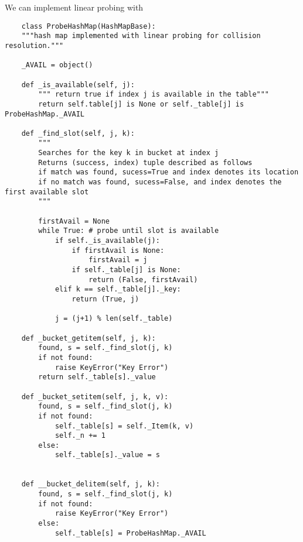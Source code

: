 \documentclass[]{article}
\begin{document}
We can implement linear probing with

\begin{lstlisting}
	class ProbeHashMap(HashMapBase):
	"""hash map implemented with linear probing for collision resolution."""
	
	_AVAIL = object()
	
	def _is_available(self, j):
		""" return true if index j is available in the table"""
		return self.table[j] is None or self._table[j] is ProbeHashMap._AVAIL
	
	def _find_slot(self, j, k):
		""" 
		Searches for the key k in bucket at index j 
		Returns (success, index) tuple described as follows
		if match was found, sucess=True and index denotes its location
		if no match was found, sucess=False, and index denotes the first available slot
		"""
		
		firstAvail = None
		while True: # probe until slot is available
			if self._is_available(j):
				if firstAvail is None:
					firstAvail = j
				if self._table[j] is None:
					return (False, firstAvail)
			elif k == self._table[j]._key:
				return (True, j)
			
			j = (j+1) % len(self._table)
	
	def _bucket_getitem(self, j, k):
		found, s = self._find_slot(j, k)
		if not found:
			raise KeyError("Key Error")
		return self._table[s]._value
	
	def _bucket_setitem(self, j, k, v):
		found, s = self._find_slot(j, k)
		if not found:
			self._table[s] = self._Item(k, v)
			self._n += 1
		else:
			self._table[s]._value = s
		
	
	def __bucket_delitem(self, j, k):
		found, s = self._find_slot(j, k)
		if not found:
			raise KeyError("Key Error")
		else:
			self._table[s] = ProbeHashMap._AVAIL
	
\end{lstlisting}\bigbreak
\end{document}
